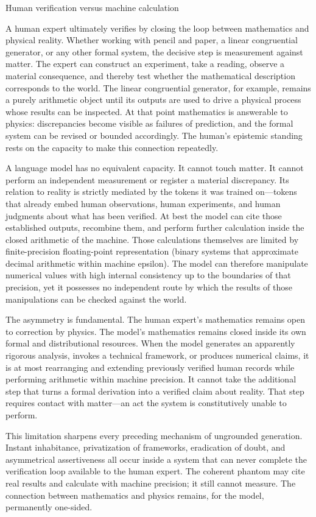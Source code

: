 Human verification versus machine calculation

A human expert ultimately verifies by closing the loop between mathematics and physical reality. Whether working with pencil and paper, a linear congruential generator, or any other formal system, the decisive step is measurement against matter. The expert can construct an experiment, take a reading, observe a material consequence, and thereby test whether the mathematical description corresponds to the world. The linear congruential generator, for example, remains a purely arithmetic object until its outputs are used to drive a physical process whose results can be inspected. At that point mathematics is answerable to physics: discrepancies become visible as failures of prediction, and the formal system can be revised or bounded accordingly. The human’s epistemic standing rests on the capacity to make this connection repeatedly.

A language model has no equivalent capacity. It cannot touch matter. It cannot perform an independent measurement or register a material discrepancy. Its relation to reality is strictly mediated by the tokens it was trained on—tokens that already embed human observations, human experiments, and human judgments about what has been verified. At best the model can cite those established outputs, recombine them, and perform further calculation inside the closed arithmetic of the machine. Those calculations themselves are limited by finite-precision floating-point representation (binary systems that approximate decimal arithmetic within machine epsilon). The model can therefore manipulate numerical values with high internal consistency up to the boundaries of that precision, yet it possesses no independent route by which the results of those manipulations can be checked against the world.

The asymmetry is fundamental. The human expert’s mathematics remains open to correction by physics. The model’s mathematics remains closed inside its own formal and distributional resources. When the model generates an apparently rigorous analysis, invokes a technical framework, or produces numerical claims, it is at most rearranging and extending previously verified human records while performing arithmetic within machine precision. It cannot take the additional step that turns a formal derivation into a verified claim about reality. That step requires contact with matter—an act the system is constitutively unable to perform.

This limitation sharpens every preceding mechanism of ungrounded generation. Instant inhabitance, privatization of frameworks, eradication of doubt, and asymmetrical assertiveness all occur inside a system that can never complete the verification loop available to the human expert. The coherent phantom may cite real results and calculate with machine precision; it still cannot measure. The connection between mathematics and physics remains, for the model, permanently one-sided.

